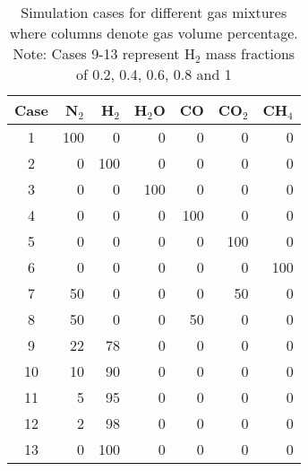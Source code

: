 \begin{table}[H]
    \centering
    \caption{Simulation cases for different gas mixtures where columns denote gas volume percentage. Note: Cases 9-13 represent H$_2$ mass fractions of 0.2, 0.4, 0.6, 0.8 and 1}
    \begin{tabular}{crrrrrr}
        \hline
        Case    & N$_2$ & H$_2$     & H$_2$O    & CO    & CO$_2$    & CH$_4$    \\
        \hline
        1       & 100   & 0         & 0         & 0     & 0         & 0         \\
        2       & 0     & 100       & 0         & 0     & 0         & 0         \\
        3       & 0     & 0         & 100       & 0     & 0         & 0         \\
        4       & 0     & 0         & 0         & 100   & 0         & 0         \\
        5       & 0     & 0         & 0         & 0     & 100       & 0         \\
        6       & 0     & 0         & 0         & 0     & 0         & 100       \\
        7       & 50    & 0         & 0         & 0     & 50        & 0         \\
        8       & 50    & 0         & 0         & 50    & 0         & 0         \\
        9       & 22    & 78        & 0         & 0     & 0         & 0         \\
        10      & 10    & 90        & 0         & 0     & 0         & 0         \\
        11      & 5     & 95        & 0         & 0     & 0         & 0         \\
        12      & 2     & 98        & 0         & 0     & 0         & 0         \\
        13      & 0     & 100       & 0         & 0     & 0         & 0         \\
        \hline
    \end{tabular}
    \label{tab:cases}
\end{table}



